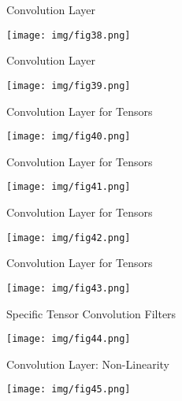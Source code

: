 \documentclass[9pt]{beamer}
\begin{document}
\begin{frame}{Convolution Layer}
\begin{center}
	\texttt{[image: img/fig38.png]} 
\end{center}
\end{frame}
	
\begin{frame}{Convolution Layer}
\begin{center}
	\texttt{[image: img/fig39.png]} 
\end{center}
\end{frame}

	
\begin{frame}{Convolution Layer for Tensors}
\begin{center}
	\texttt{[image: img/fig40.png]} 
\end{center}
\end{frame}
	
\begin{frame}{Convolution Layer for Tensors}
\begin{center}
	\texttt{[image: img/fig41.png]} 
\end{center}
\end{frame}
	
\begin{frame}{Convolution Layer for Tensors}
\begin{center}
	\texttt{[image: img/fig42.png]} 
\end{center}
\end{frame}
	
\begin{frame}{Convolution Layer for Tensors}
\begin{center}
	\texttt{[image: img/fig43.png]} 
\end{center}
\end{frame}
	
\begin{frame}{Specific Tensor Convolution Filters}
\begin{center}
	\texttt{[image: img/fig44.png]} 
\end{center}
\end{frame}
	
\begin{frame}{Convolution Layer: Non-Linearity}
\begin{center}
	\texttt{[image: img/fig45.png]} 
\end{center}
\end{frame}
\end{document}
